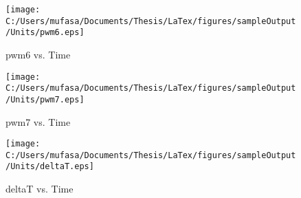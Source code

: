 \begin{figure}[H]
	\centering
	\caption{pwm6 vs. Time}
		\texttt{[image: C:/Users/mufasa/Documents/Thesis/LaTex/figures/sampleOutput/Units/pwm6.eps]}
\end{figure}
\begin{figure}[H]
	\centering
	\caption{pwm7 vs. Time}
		\texttt{[image: C:/Users/mufasa/Documents/Thesis/LaTex/figures/sampleOutput/Units/pwm7.eps]}
\end{figure}
\begin{figure}[H]
	\centering
	\caption{deltaT vs. Time}
		\texttt{[image: C:/Users/mufasa/Documents/Thesis/LaTex/figures/sampleOutput/Units/deltaT.eps]}
\end{figure}
